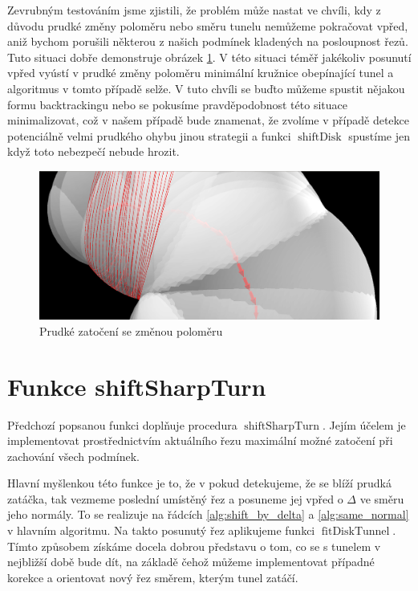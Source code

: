 Zevrubným testováním jsme zjistili, že problém může nastat ve chvíli, kdy
z důvodu prudké změny poloměru nebo směru tunelu nemůžeme pokračovat vpřed, aniž
bychom porušili některou z našich podmínek kladených na posloupnost řezů.
Tuto situaci dobře demonstruje obrázek \ref{fig:sharp_curve}. V této situaci
téměř jakékoliv posunutí vpřed vyústí v prudké změny poloměru minimální kružnice
obepínající tunel a algoritmus v tomto případě selže. V tuto chvíli se buďto
můžeme spustit nějakou formu backtrackingu nebo se pokusíme pravděpodobnost
této situace minimalizovat, což v našem případě bude znamenat, že zvolíme v případě
detekce potenciálně velmi prudkého ohybu jinou strategii a funkci
$ \operatorname{shiftDisk} $ spustíme jen když toto nebezpečí nebude hrozit.

\begin{figure}[ht]
    \centering
    \includegraphics[width=\textwidth]{img/sharp_curve.png}
    \caption{Prudké zatočení se změnou poloměru}
  \centering
  \label{fig:sharp_curve}
\end{figure}





\section{Funkce shiftSharpTurn} \label{subsec:shift_sharp_turn}
Předchozí popsanou funkci doplňuje procedura $ \operatorname{shiftSharpTurn} $.
Jejím účelem je implementovat prostřednictvím aktuálního řezu maximální možné
zatočení při zachování všech podmínek.

Hlavní myšlenkou této funkce je to, že v pokud detekujeme, že se blíží prudká
zatáčka, tak vezmeme poslední umístěný řez a posuneme jej vpřed o $ \Delta $ ve směru
jeho normály. To se realizuje na řádcích \ref{alg:shift_by_delta} a
\ref{alg:same_normal} v hlavním algoritmu. Na takto posunutý řez aplikujeme
funkci $ \operatorname{fitDiskTunnel} $. Tímto způsobem získáme docela dobrou
představu o tom, co se s tunelem v nejbližší době bude dít, na základě čehož
můžeme implementovat případné korekce a orientovat nový řez směrem, kterým
tunel zatáčí.


